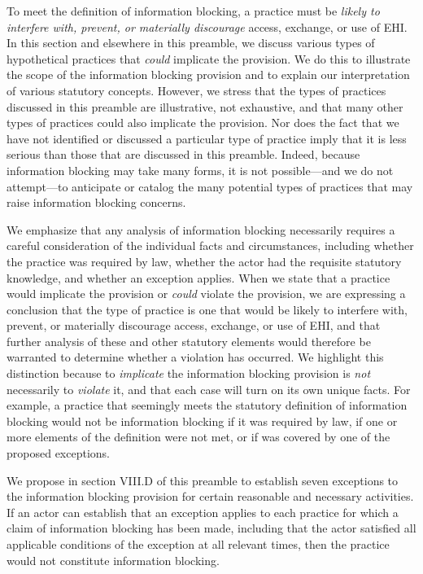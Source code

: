 \documentclass[twoside,11pt]{article}
\begin{document}
          To meet the definition of information blocking, a practice must be \emph{likely to interfere with, prevent, or materially discourage} access, exchange, or use of EHI. In this section and elsewhere in this preamble, we discuss various types of hypothetical practices that \emph{could} implicate the provision. We do this to illustrate the scope of the information blocking provision and to explain our interpretation of various statutory concepts. However, we stress that the types of practices discussed in this preamble are illustrative, not exhaustive, and that many other types of practices could also implicate the provision. Nor does the fact that we have not identified or discussed a particular type of practice imply that it is less serious than those that are discussed in this preamble. Indeed, because information blocking may take many forms, it is not possible—and we do not attempt—to anticipate or catalog the many potential types of practices that may raise information blocking concerns.



          We emphasize that any analysis of information blocking necessarily requires a careful consideration of the individual facts and circumstances, including whether the practice was required by law, whether the actor had the requisite statutory knowledge, and whether an exception applies. When we state that a practice would implicate the provision or \emph{could} violate the provision, we are expressing a conclusion that the type of practice is one that would be likely to interfere with, prevent, or materially discourage access, exchange, or use of EHI, and that further analysis of these and other statutory elements would therefore be warranted to determine whether a violation has occurred. We highlight this distinction because to \emph{implicate} the information blocking provision is \emph{not} necessarily to \emph{violate} it, and that each case will turn on its own unique facts. For example, a practice that seemingly meets the statutory definition of information blocking would not be information blocking if it was required by law, if one or more elements of the definition were not met, or if was covered by one of the proposed exceptions.



          We propose in section VIII.D of this preamble to establish seven exceptions to the information blocking provision for certain reasonable and necessary activities. If an actor can establish that an exception applies to each practice for which a claim of information blocking  \ifhmode\expandafter\xspace\fi has been made, including that the actor satisfied all applicable conditions of the exception at all relevant times, then the practice would not constitute information blocking.
\end{document}
